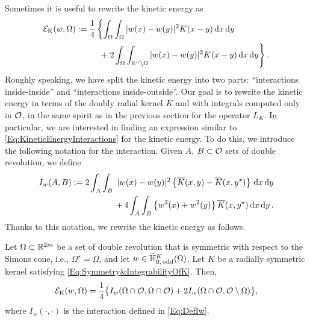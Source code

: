 Sometimes it is useful to rewrite the kinetic energy as
\begin{equation}
	\label{Eq:KineticEnergyInteractions}
	\begin{split}
	\mathcal{E}_\mathrm{K}(w, \Omega) := \dfrac{1}{4} \left \{ \int_\Omega \int_\Omega |w(x) - w(y)|^2 K(x-y) \,\mathrm{d} x \,\mathrm{d} y \right. \qquad \qquad \\
	+\left. 2 \int_\Omega \int_{\mathbb{R}^n \setminus \Omega} |w(x) - w(y)|^2 K(x-y) \,\mathrm{d} x \,\mathrm{d} y \right \}.
	\end{split}	
\end{equation}
Roughly speaking, we have split the kinetic energy into two parts: ``interactions inside-inside'' and ``interactions inside-outside''. Our goal is to rewrite the kinetic energy in terms of the doubly radial kernel $\overline{K}$ and with integrals computed only in $\mathcal{O}$, in the same spirit as in the previous section for the operator $L_K$. In particular, we are interested in finding an expression similar to \eqref{Eq:KineticEnergyInteractions} for the kinetic energy. To do this, we introduce the following notation for the interaction. Given $A$, $B\subset \mathcal{O}$ sets of double revolution, we define
\begin{equation}
	\label{Eq:DefIw}
	\begin{split}
	I_w(A,B) := 2\int_A  \int_B  \ |w(x)-w(y)|^2 \left\{ \overline{K}(x,y) - \overline{K}(x,y^\star) \right\} \,\mathrm{d} x \,\mathrm{d} y  \\
	+\, 4 \int_A  \int_B  \left\{w^2(x)+w^2(y)\right\} \overline{K}(x,y^\star) \,\mathrm{d} x \,\mathrm{d} y\,.
	\end{split}
\end{equation}
Thanks to this notation, we rewrite the kinetic energy as follows.


\begin{lemma}
	\label{Lemma:ShortExpressionEnergy}
Let $\Omega\subset \mathbb{R}^{2m}$ be a set of double revolution that is symmetric with respect to the Simons cone, i.e., $\Omega^\star = \Omega$, and let $w\in \widetilde{\mathbb{H}}^K_{0,\, \mathrm{odd}}(\Omega)$. Let $K$ be a radially symmetric kernel satisfying \eqref{Eq:Symmetry&IntegrabilityOfK}. Then, 
\begin{align}
\label{Eq:ShortExpressionEnergy}
\mathcal{E}_\mathrm{K}(w, \Omega) = \frac{1}{4} \big \{I_w(\Omega\cap\mathcal{O},\Omega\cap\mathcal{O}) +  2I_w(\Omega\cap\mathcal{O},\mathcal{O}\setminus\Omega) \big \},
\end{align}
where $I_w(\cdot, \cdot)$ is the interaction defined in \eqref{Eq:DefIw}.
\end{lemma}

